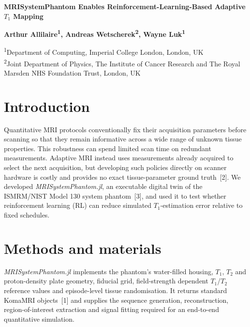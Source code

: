 \documentclass[10pt,a4paper]{article}
\begin{document}
\begin{center}
  {\fontsize{14}{16}\selectfont\bfseries
  MRISystemPhantom Enables Reinforcement-Learning-Based Adaptive $T_1$ Mapping\par}
  \vspace{5pt}
  {\bfseries Arthur Allilaire\textsuperscript{1},
  Andreas Wetscherek\textsuperscript{2},
  Wayne Luk\textsuperscript{1}\par}
  \vspace{3pt}
  {\fontsize{10}{11.5}\selectfont
  \textsuperscript{1}Department of Computing, Imperial College London, London, UK\\
  \textsuperscript{2}Joint Department of Physics, The Institute of Cancer Research and
  The Royal Marsden NHS Foundation Trust, London, UK\par}
\end{center}

\section{Introduction}
Quantitative MRI protocols conventionally fix their acquisition parameters
before scanning so that they remain informative across a wide range of unknown
tissue properties. This robustness can spend limited scan time on redundant
measurements. Adaptive MRI instead uses measurements already acquired to select
the next acquisition, but developing such policies directly on scanner hardware
is costly and provides no exact tissue-parameter ground truth~[2]. We developed
\textit{MRISystemPhantom.jl}, an executable digital twin of the ISMRM/NIST Model
130 system phantom~[3], and used it to test whether reinforcement learning (RL) can
reduce simulated $T_1$-estimation error relative to fixed schedules.

\section{Methods and materials}
\textit{MRISystemPhantom.jl} implements the phantom's water-filled housing,
$T_1$, $T_2$ and proton-density plate geometry, fiducial grid, field-strength
dependent $T_1$/$T_2$ reference values and episode-level tissue randomisation. It returns
standard KomaMRI objects~[1] and supplies the sequence generation, reconstruction,
region-of-interest extraction and signal fitting required for an end-to-end
quantitative simulation.
\end{document}
